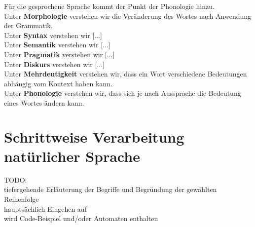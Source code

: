 \documentclass[12pt,twoside]{article}
\theoremstyle{plain}
\theoremstyle{definition}
\theoremstyle{remark}
\begin{document}
Für die gesprochene Sprache kommt der Punkt der Phonologie hinzu.\\
Unter \textbf{Morphologie} verstehen wir die Veränderung des Wortes nach Anwendung der Grammatik. \\
Unter \textbf{Syntax} verstehen wir [...]\\
Unter \textbf{Semantik} verstehen wir [...]\\
Unter \textbf{Pragmatik} verstehen wir [...]\\
Unter \textbf{Diskurs} verstehen wir [...]\\
Unter \textbf{Mehrdeutigkeit} verstehen wir, dass ein Wort verschiedene Bedeutungen abhängig vom Kontext haben kann.\\
Unter \textbf{Phonologie} verstehen wir, dass sich je nach Aussprache die Bedeutung eines Wortes ändern kann.
\section{Schrittweise Verarbeitung natürlicher Sprache}
\label{sec:meth}
TODO:\\
tiefergehende Erläuterung der Begriffe und Begründung der gewählten Reihenfolge\\
hauptsächlich Eingehen auf \cite{Jur2009}\\
wird Code-Beispiel und/oder Automaten enthalten
\end{document}
